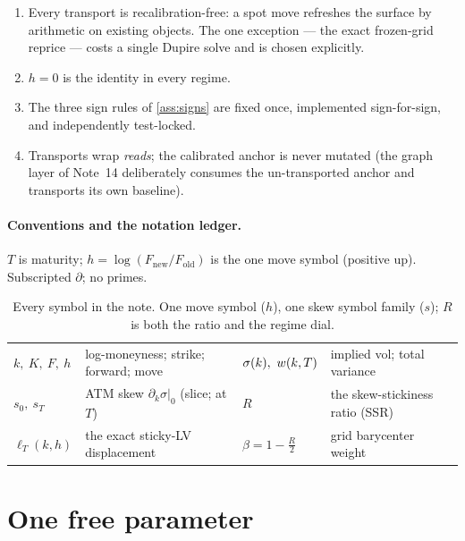 \documentclass[11pt]{article}
\begin{document}
\begin{invariant}
\begin{enumerate}[leftmargin=1.6em]
\item Every transport is recalibration-free: a spot move refreshes the
surface by arithmetic on existing objects.  The one exception --- the
exact frozen-grid reprice --- costs a single Dupire solve and is chosen
explicitly.
\item $h=0$ is the identity in every regime.
\item The three sign rules of \cref{ass:signs} are fixed once,
implemented sign-for-sign, and independently test-locked.
\item Transports wrap \emph{reads}; the calibrated anchor is never
mutated (the graph layer of Note~14 deliberately consumes the
un-transported anchor and transports its own baseline).
\end{enumerate}
\end{invariant}

\paragraph{Conventions and the notation ledger.}
$T$ is maturity; $h=\log(F_{\mathrm{new}}/F_{\mathrm{old}})$ is the one
move symbol (positive up).  Subscripted $\partial$; no primes.

\begin{table}[H]
\centering\footnotesize
\setlength{\tabcolsep}{3pt}
\begin{tabular}{@{}llll@{}}
\toprule
$k,\ K,\ F,\ h$ & log-moneyness; strike; forward; move &
$\sigma(k),\ \tvar(k,T)$ & implied vol; total variance\\[2pt]
$s_0,\ s_T$ & ATM skew $\partial_k\sigma|_{0}$ (slice; at $T$) &
$R$ & the skew-stickiness ratio (SSR)\\[2pt]
$\ell_T(k,h)$ & the exact sticky-LV displacement &
$\beta=1-\tfrac{R}{2}$ & grid barycenter weight\\
\bottomrule
\end{tabular}
\caption{Every symbol in the note.  One move symbol ($h$), one skew
symbol family ($s$); $R$ is both the ratio and the regime dial.}
\label{tab:ledger}
\end{table}

\section{One free parameter}
\label{sec:oneparam}
\end{document}
